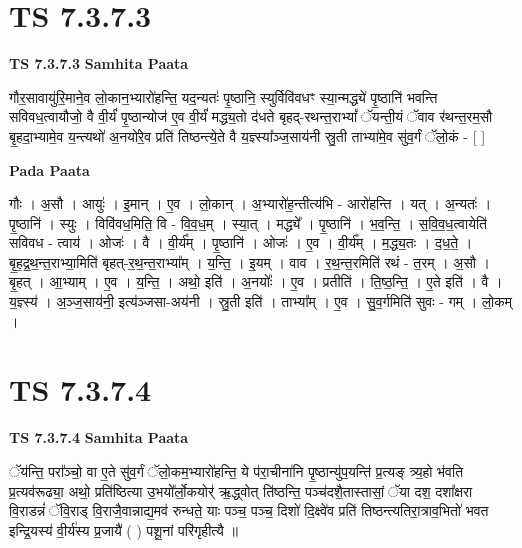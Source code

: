 \documentclass[17pt]{extarticle}
\begin{document}

\section{ TS 7.3.7.3 }

\textbf{TS 7.3.7.3 } \newline
\textbf{Samhita Paata} \newline

गौर॒सावायु॑रि॒माने॒व लो॒कान॒भ्यारो॑हन्ति॒ यद॒न्यतः॑ पृ॒ष्ठानि॒ स्युर्विवि॑वधꣳ स्या॒न्मद्ध्ये॑ पृ॒ष्ठानि॑ भवन्ति सविवध॒त्वायौजो॒ वै वी॒र्यं॑ पृ॒ष्ठान्योज॑ ए॒व वी॒र्यं॑ मद्ध्य॒तो द॑धते बृहद्-रथन्त॒राभ्यां᳚ ॅयन्ती॒यं ॅवाव र॑थन्त॒रम॒सौ बृ॒हदा॒भ्यामे॒व य॒न्त्यथो॑ अ॒नयो॑रे॒व प्रति॑ तिष्ठन्त्ये॒ते वै य॒ज्ञ्स्या᳚ञ्ज॒साय॑नी स्रु॒ती ताभ्या॑मे॒व सु॑व॒र्गं ॅलो॒कं - [  ] \newline

\textbf{Pada Paata} \newline

गौः । अ॒सौ । आयुः॑ । इ॒मान् । ए॒व । लो॒कान् । अ॒भ्यारो॑ह॒न्तीत्य॑भि - आरो॑हन्ति । यत् । अ॒न्यतः॑ । पृ॒ष्ठानि॑ । स्युः । विवि॑वध॒मिति॒ वि - वि॒व॒ध॒म् । स्या॒त् । मद्ध्ये᳚ । पृ॒ष्ठानि॑ । भ॒व॒न्ति॒ । स॒वि॒व॒ध॒त्वायेति॑ सविवध - त्वाय॑ । ओजः॑ । वै । वी॒र्य᳚म् । पृ॒ष्ठानि॑ । ओजः॑ । ए॒व । वी॒र्य᳚म् । म॒द्ध्य॒तः । द॒ध॒ते॒ । बृ॒ह॒द्र॒थ॒न्त॒राभ्या॒मिति॑ बृहत्-र॒थ॒न्त॒राभ्या᳚म् । य॒न्ति॒ । इ॒यम् । वाव । र॒थ॒न्त॒रमिति॑ रथं - त॒रम् । अ॒सौ । बृ॒हत् । आ॒भ्याम् । ए॒व । य॒न्ति॒ । अथो॒ इति॑ । अ॒नयोः᳚ । ए॒व । प्रतीति॑ । ति॒ष्ठ॒न्ति॒ । ए॒ते इति॑ । वै । य॒ज्ञ्स्य॑ । अ॒ञ्ज॒साय॑नी॒ इत्य॑ञ्जसा-अय॑नी । स्रु॒ती इति॑ । ताभ्या᳚म् । ए॒व । सु॒व॒र्गमिति॑ सुवः - गम् । लो॒कम् ।  \newline





\section{ TS 7.3.7.4 }

\textbf{TS 7.3.7.4 } \newline
\textbf{Samhita Paata} \newline

ॅय॑न्ति॒ परा᳚ञ्चो॒ वा ए॒ते सु॑व॒र्गं ॅलो॒कम॒भ्यारो॑हन्ति॒ ये प॑रा॒चीना॑नि पृ॒ष्ठान्यु॑प॒यन्ति॑ प्र॒त्यङ् त्र्य॒हो भ॑वति प्र॒त्यव॑रूढ्या॒ अथो॒ प्रति॑ष्ठित्या उ॒भयो᳚र्लो॒कयोर्॑ ऋ॒द्ध्वोत् ति॑ष्ठन्ति॒ पञ्च॑दशै॒तास्तासां॒ ॅया दश॒ दशा᳚क्षरा वि॒राडन्नं॑ ॅवि॒राड् वि॒राजै॒वान्नाद्य॒मव॑ रुन्धते॒ याः पञ्च॒ पञ्च॒ दिशो॑ दि॒क्ष्वे॑व प्रति॑ तिष्ठन्त्यतिरा॒त्राव॒भितो॑ भवत इन्द्रि॒यस्य॑ वी॒र्य॑स्य प्र॒जायै॑ ( ) पशू॒नां परि॑गृहीत्यै ॥ \newline
\end{document}
